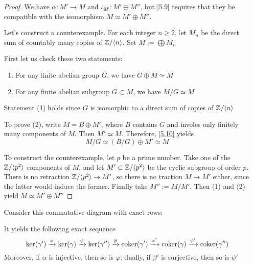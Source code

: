 \documentclass[11pt]{article}
\begin{document}
\begin{proof}
We have \(\alpha:M'\to M\) and \(\iota_{M'}:M'\oplus M''\), but \ref{5.9} requires
that they be compatible with the isomorphism \(M\simeq M'\oplus M''\).

Let's construct a counterexample. For each integer \(n\ge2\), let \(M_n\) be
the direct sum of countably many copies of \(\mathbb{Z}/\langle n\rangle\). Set
\(M:=\bigoplus M_n\)

First let us check these two statements:
\begin{enumerate}
\item For any finite abelian group \(G\), we have \(G\oplus M\simeq M\)
\item For any finite abelian subgroup \(G\subset M\), we have \(M/G\simeq M\)
\end{enumerate}


Statement (1) holds since \(G\) is isomorphic to a direct sum of copies of
\(\mathbb{Z}/\langle n\rangle\)

To prove (2), write \(M=B\oplus M'\), where \(B\) contains \(G\) and involes
only finitely many components of \(M\). Then \(M'\simeq M\). Therefore,
\ref{5.10} yields
\begin{equation*}
M/G\simeq(B/G)\oplus M'\simeq M
\end{equation*}

To construct the counterexample, let \(p\) be a prime number. Take one of the
\(\mathbb{Z}/\langle p^2\rangle\) components of \(M\), and let \(M'\subset\mathbb{Z}/\langle p^2\rangle\) be
the cyclic subgroup of order \(p\). There is no retraction \(\mathbb{Z}/\langle p^2\rangle\to
   M'\), so there is no traction \(M\to M'\) either, since the latter would
induce the former. Finally take \(M'':=M/M'\). Then (1) and (2) yield
\(M\simeq M'\oplus M''\)
\end{proof}

\begin{lemma}[Snake]
Consider this commutative diagram with exact rows:
\begin{center}
\end{center}
It yields the following exact sequence
\begin{equation*}
\ker(\gamma')\xrightarrow{\varphi}\ker(\gamma)\xrightarrow{\psi}\ker(\gamma'')
\xrightarrow{\partial}\operatorname{coker}(\gamma')\xrightarrow{\varphi'}\operatorname{coker}(\gamma)
\xrightarrow{\psi'}\operatorname{coker}(\gamma'')
\end{equation*}
Moreover, if \(\alpha\) is injective, then so is \(\varphi\); dually, if \(\beta'\) is
surjective, then so is \(\psi'\)
\end{lemma}
\end{document}
